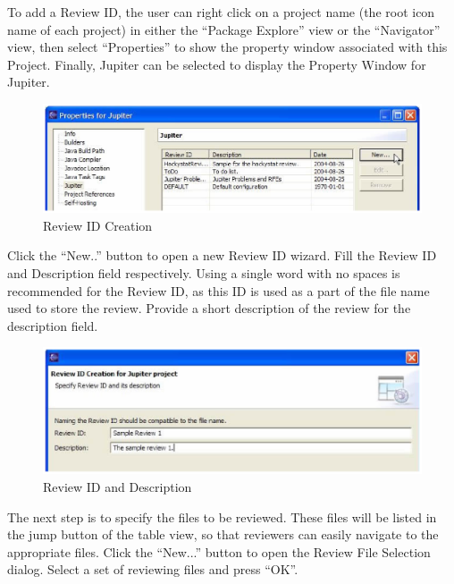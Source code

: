 To add a Review ID, the user can right click on a project name (the root icon name of each project) in either the ``Package Explore'' view or the ``Navigator'' view, then select ``Properties'' to show the property window associated with this Project.  Finally, Jupiter can be selected to display the Property Window for Jupiter.

\begin{figure}[htbp]
  \centering
  \includegraphics{images/fig3-2.eps}
  \caption{Review ID Creation}
  \label{fig3-2}
\end{figure}
 
Click the ``New..'' button to open a new Review ID wizard. Fill the Review ID and Description field respectively. Using a single word with no spaces is recommended for the Review ID, as this ID is used as a part of the file name used to store the review. Provide a short description of the review for the description field.

\begin{figure}[htbp]
  \centering
  \includegraphics{images/fig3-3.eps}
  \caption{Review ID and Description}
  \label{fig3-3}
\end{figure}
 
The next step is to specify the files to be reviewed. These files will be listed in the jump button of the table view, so that reviewers can easily navigate to the appropriate files. Click the ``New...'' button to open the Review File Selection dialog. Select a set of reviewing files and press ``OK''.

